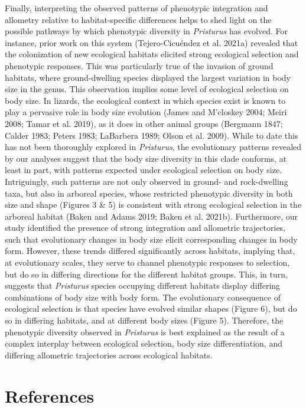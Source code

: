 \documentclass[
  11pt,
]{article}
\begin{document}
Finally, interpreting the observed patterns of phenotypic integration
and allometry relative to habitat-specific differences helps to shed
light on the possible pathways by which phenotypic diversity in
\emph{Pristurus} has evolved. For instance, prior work on this system
(Tejero-Cicuéndez et al. 2021a) revealed that the colonization of new
ecological habitats elicited strong ecological selection and phenotypic
responses. This was particularly true of the invasion of ground
habitats, where ground-dwelling species displayed the largest variation
in body size in the genus. This observation implies some level of
ecological selection on body size. In lizards, the ecological context in
which species exist is known to play a pervasive role in body size
evolution (James and M'closkey 2004; Meiri 2008; Tamar et al. 2019), as
it does in other animal groups (Bergmann 1847; Calder 1983; Peters 1983;
LaBarbera 1989; Olson et al. 2009). While to date this has not been
thoroughly explored in \emph{Pristurus}, the evolutionary patterns
revealed by our analyses suggest that the body size diversity in this
clade conforms, at least in part, with patterns expected under
ecological selection on body size. Intriguingly, such patterns are not
only observed in ground- and rock-dwelling taxa, but also in arboreal
species, whose restricted phenotypic diversity in both size and shape
(Figures 3 \& 5) is consistent with strong ecological selection in the
arboreal habitat (Baken and Adams 2019; Baken et al. 2021b).
Furthermore, our study identified the presence of strong integration and
allometric trajectories, such that evolutionary changes in body size
elicit corresponding changes in body form. However, these trends
differed significantly across habitats, implying that, at evolutionary
scales, they serve to channel phenotypic responses to selection, but do
so in differing directions for the different habitat groups. This, in
turn, suggests that \emph{Pristurus} species occupying different
habitats display differing combinations of body size with body form. The
evolutionary consequence of ecological selection is that species have
evolved similar shapes (Figure 6), but do so in differing habitats, and
at different body sizes (Figure 5). Therefore, the phenotypic diversity
observed in \emph{Pristurus} is best explained as the result of a
complex interplay between ecological selection, body size
differentiation, and differing allometric trajectories across ecological
habitats.

\newpage

\hypertarget{references}{%
\section*{References}\label{references}}
\end{document}
